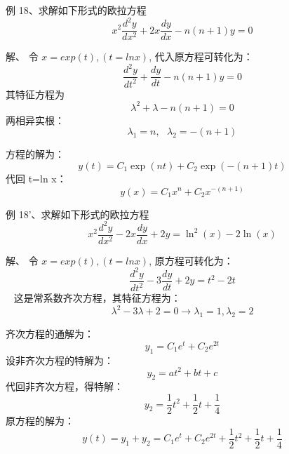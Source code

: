 \begin{frame}
	\begin{exampleblock} {例 18、求解如下形式的欧拉方程}
	\begin{equation*}
		x^2 \frac{d^2 y}{d x^2} +2x \frac{d y}{d x} -n(n+1) y =0 
	\end{equation*}     
	\end{exampleblock}
	\alert{解、} 	令 $x=exp(t) , (t=ln x) $, 代入原方程可转化为：
	\begin{equation*}
		\frac{d^2 y}{d t^2}  +\frac{dy}{dt}-n(n+1) y =0 
	\end{equation*}     
	其特征方程为
	\begin{equation*}
		\lambda^2 +\lambda -n(n+1) =0	
	\end{equation*}    
	两相异实根：
	\begin{equation*}
		\lambda_1=n, ~~~\lambda_2= -(n+1)
	\end{equation*}  
\end{frame}

\begin{frame}  
	方程的解为：
	\begin{equation*}
		y(t)=C_1 \exp (nt) +C_2 \exp (-(n+1) t)
	\end{equation*}  
	代回 t=ln x：
	\begin{equation*}
		y(x)=C_1 x^n +C_2 x^{-(n+1) }
	\end{equation*}   
\end{frame}

\begin{frame}
	\begin{exampleblock} {例 18'、求解如下形式的欧拉方程}
	\begin{equation*}
		x^2 \frac{d^2 y}{d x^2} -2x \frac{d y}{d x} +2y = \ln^2( x) -2 \ln(x) 
	\end{equation*}    
	\end{exampleblock}
	\alert{解、} 	令 $x=exp(t) , (t=ln x) $, 原方程可转化为：
	\begin{equation*}
 		\frac{d^2 y}{d t^2}  -3\frac{dy}{dt} +2 y =t^2 -2t 
 	\end{equation*}    
 	这是常系数齐次方程，其特征方程为：
 	\begin{equation*}
 		\lambda^2  -3\lambda +2  =0  \to  \lambda_1=1,   \lambda_2=2 
 	\end{equation*}   
\end{frame}


\begin{frame}
	齐次方程的通解为：
	\begin{equation*}
		y_1=C_1 e^t +C_2 e^{2t}
	\end{equation*}   
	设非齐次方程的特解为：
	\begin{equation*}
		y_2=a t^2+bt+c
	\end{equation*} 
	代回非齐次方程，得特解：
	\begin{equation*}
		y_2=\frac{1}{2} t^2+\frac{1}{2}t+\frac{1}{4}
	\end{equation*} 
	原方程的解为：
	\begin{equation*}
		y(t)=y_1+y_2=C_1 e^t +C_2 e^{2t}+\frac{1}{2} t^2+\frac{1}{2}t+\frac{1}{4}
	\end{equation*} 
\end{frame}


